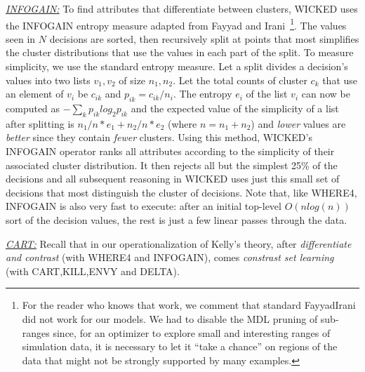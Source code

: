 \documentclass[runningheads]{llncs}
\begin{document}
\underline{{\em INFOGAIN:}} To find attributes that differentiate between clusters,
WICKED uses the INFOGAIN entropy measure adapted from
Fayyad and Irani~\cite{FayIra93Multi}\footnote{For the reader
who knows that work, we comment that standard
FayyadIrani did not work for our models. We had to disable
the MDL pruning of sub-ranges since, for an optimizer to explore  small
and interesting ranges of simulation data, it is necessary
to let it ``take a chance'' on regions of the data that might not
be strongly supported by many examples.}. The values seen in $N$
decisions are sorted, then recursively split at points that
most simplifies the cluster distributions that use the values
in each part of the split. To measure simplicity, we use the
standard entropy measure. Let a split divides a decision's
values into two
lists  $v_1,v_2$ of size $n_1,n_2$. Let  the total counts
of cluster $c_k$ that use an element of $v_i$ be $c_{ik}$
and 
$p_{ik} = c_{ik}/n_i$. The entropy $e_i$ of the list $v_i$ can now be computed
as 
$-\sum_{k}p_{ik}log_2{p_{ik}}$ and the expected value of the simplicity
of a list after splitting is 
\mbox{$n_1/n*e_1 + n_2/n*e_2$} (where $n=n_1 + n_2$)
and {\em lower} values are {\em better} since they contain {\em fewer}
clusters.
Using this method, WICKED's INFOGAIN operator ranks 
all attributes according to the  simplicity of their associated
cluster distribution. It then rejects all but the simplest
25\% of the decisions and all subsequent reasoning in WICKED
uses just this small set of decisions that most distinguish
the cluster of decisions. Note that, like WHERE4, INFOGAIN is
also very fast to execute: after an initial top-level 
$O(nlog(n))$
sort of the decision values, the rest is just a
few linear
passes through the data.

\underline{{\em CART:}} Recall that in our
operationalization of Kelly's theory,
after {\em differentiate and
contrast} (with
WHERE4 and INFOGAIN), comes {\em constrast set learning}
(with CART,KILL,ENVY and DELTA).
\end{document}
